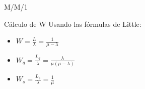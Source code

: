 \begin{frame}{M/M/1}

		\begin{block}{Cálculo de W}
		Usando las fórmulas de Little: \pause
		\begin{itemize}
			\item $W=\frac{L}{\lambda}=\frac{1}{\mu-\lambda}$ \pause
			\item $W_q=\frac{L_q}{\lambda}=\frac{\lambda}{\mu(\mu-\lambda)}$ \pause
			\item$W_s=\frac{L_s}{\lambda}=\frac{1}{\mu}$
		\end{itemize}
		\end{block}
\end{frame}